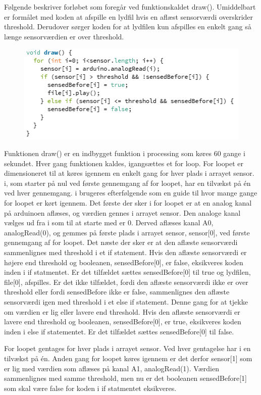 Følgende beskriver forløbet som foregår ved funktionskaldet draw(). Umiddelbart er formålet med koden at afspille en lydfil hvis en aflæst sensorværdi overskrider threshold. Derudover sørger koden for at lydfilen kun afspilles en enkelt gang så længe sensorværdien er over threshold. 

\begin{figure}
\includegraphics[scale=0.8]{Figure/programkode04.png}
\end{figure}  

Funktionen draw() er en indbygget funktion i processing som køres 60 gange i sekundet. 
Hver gang funktionen kaldes, igangsættes et for loop. For loopet er dimensioneret til at køres igennem en enkelt gang for hver plads i arrayet sensor. i, som starter på nul ved første gennemgang af for loopet, har en tilvækst på én ved hver gennemgang. i brugeres efterfølgende som en guide til hvor mange gange for loopet er kørt igennem. 
Det første der sker i for loopet er at en analog kanal på arduinoen aflæses, og værdien gennes i arrayet sensor. Den analoge kanal vælges ud fra i som til at starte med er 0. Derved aflæses kanal A0, analogRead(0), og gemmes på første plads i arrayet sensor, sensor[0], ved første gennemgang af for loopet. 
Det næste der sker er at den aflæste sensorværdi sammenlignes med threshold i et if statement. Hvis den aflæste sensorværdi er højere end threshold og booleanen, sensedBefore[0], er false, eksikveres koden inden i if statmentet. Er det tilfældet sættes sensedBefore[0] til true og lydfilen, file[0], afspilles.
Er det ikke tilfældet, fordi den aflæste sensorværdi ikke er over threshold eller fordi sensedBefore ikke er false, sammenlignes den aflæste sensorværdi igen med threshold i et else if statement. Denne gang for at tjekke om værdien er lig eller lavere end threshold. Hvis den aflæste sensorværdi er lavere end threshold og booleanen, sensedBefore[0], er true, eksikveres koden inden i else if statementet. Er det tilfældet sættes sensedBefore[0] til false.

For loopet gentages for hver plads i arrayet sensor. Ved hver gentagelse har i en tilvækst på én. Anden gang for loopet køres igennem er det derfor sensor[1] som er lig med værdien som aflæses på kanal A1, analogRead(1). Værdien sammenlignes med samme threshold, men nu er det booleanen sensedBefore[1] som skal være false for koden i if statmentet eksikveres. 

